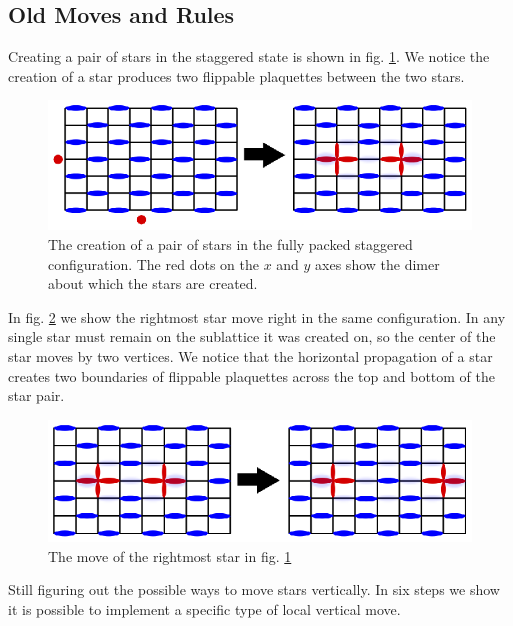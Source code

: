 \documentclass[aps,floatfix,11pt]{revtex4-1}
\begin{document}
\subsection{Old Moves and Rules}

Creating a pair of stars in the staggered state is shown in fig. \ref{fig:old_create_pair}. We notice
the creation of a star produces two flippable plaquettes between the two stars.

\begin{figure}[h]
    \centering
    \includegraphics[width=8.5 cm]{old_create_pair}
    \caption{The creation of a pair of stars in the fully packed staggered configuration. The red
    dots on the $x$ and $y$ axes show the dimer about which the stars are created.
\label{fig:old_create_pair}}
\end{figure}

\noindent In fig. \ref{fig:old_move_right} we show the rightmost star move right in the same
configuration. In any single star must remain on the sublattice it was created on, so the center of
the star moves by two vertices. We notice that the horizontal propagation of a star creates two boundaries of
flippable plaquettes across the top and bottom of the star pair. 

\begin{figure}[h]
    \centering
    \includegraphics[width=8.5 cm]{old_move_right}
    \caption{The move of the rightmost star in fig. \ref{fig:old_create_pair} \label{fig:old_move_right}}
\end{figure}

Still figuring out the possible ways to move stars vertically. In six steps we show it is possible
to implement a specific type of local vertical move. 
\\
\end{document}
